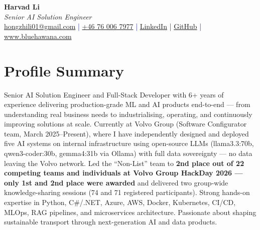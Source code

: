 \documentclass[a4paper,10pt]{article}
\begin{document}
\pagestyle{empty}

\begin{center}
{\LARGE \textbf{Harvad Li}}\\[10pt]
{\Large \textit{Senior AI Solution Engineer}}\\[10pt]
\textcolor{darkblue}{
  \href{mailto:hongzhili01@gmail.com}{hongzhili01@gmail.com} |
  \href{tel:+46760067977}{+46 76 006 7977} |
  \href{https://www.linkedin.com/in/harvad/}{LinkedIn} |
  \href{https://github.com/bluehawana}{GitHub} |
  \href{https://www.bluehawana.com}{www.bluehawana.com}
}
\end{center}

\section*{Profile Summary}
Senior AI Solution Engineer and Full-Stack Developer with 6+ years of experience
delivering production-grade ML and AI products end-to-end --- from understanding real
business needs to industrialising, operating, and continuously improving solutions at
scale. Currently at Volvo Group (Software Configurator team, March 2025--Present),
where I have independently designed and deployed five AI systems on internal
infrastructure using open-source LLMs (llama3.3:70b, qwen3-coder:30b, gemma4:31b via
Ollama) with full data sovereignty --- no data leaving the Volvo network. Led the
``Non-List'' team to \textbf{2nd place out of 22 competing teams and individuals at
Volvo Group HackDay 2026 --- only 1st and 2nd place were awarded} and
delivered two group-wide knowledge-sharing sessions (74 and 71 registered participants).
Strong hands-on expertise in Python, C\#/.NET, Azure, AWS, Docker, Kubernetes, CI/CD,
MLOps, RAG pipelines, and microservices architecture. Passionate about shaping
sustainable transport through next-generation AI and data products.

\end{document}
